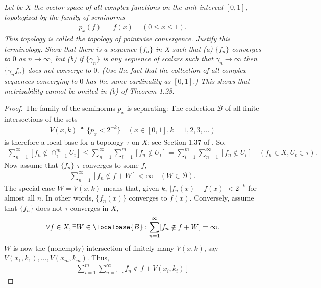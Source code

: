 \textit{
Let be $X$ the vector space of all complex functions on the unit interval %
$[0, 1]$, topologized by the family of seminorms %
%
\begin{align}
  p_x(f)= |f(x)\ \quad (0\leq x\leq 1).\nonumber
\end{align}
%
This topology is called the topology of pointwise convergence. %
Justify this terminology. %
%
Show that there is a sequence $\{f_n\}$ in X such that (a) %
%
  $\{f_n\}$ converges to $0$ as $n \to\infty$, %
%
but (b) if $\{\gamma_n\}$ is any sequence of scalars such that %
%
  $\gamma_n\to\infty$ %
%
then $\{\gamma_n f_n\}$ does not converge to $0$. %
(Use the fact that the collection of all complex sequences converging to $0$ %
has the same cardinality as $[0, 1]$.) %
%
This shows that metrizability cannot be omited in (b) of Theorem 1.28.
}
%
\begin{proof}
The family of the seminorms $p_x$ is separating: %
The collection $\mathscr{B}$ of all finite intersections of the sets %
%
\begin{align}
  V(x,k) \triangleq \{p_x < 2^{\minus k}\} 
  \quad (x \in [0, 1], k=1, 2, 3, \dots)
\end{align}
%
is therefore a local base for a topology $\tau$ on $X$; %
see Section 1.37 of \cite{FA}. %
So, 
%
\begin{align}
  \label{Inequality boolean series}
  \sum_{n=1}^\infty [f_n \notin \cap_{i=1}^m U_i] \leq 
  \sum_{n=1}^\infty \sum_{i=1}^m      [f_n \notin U_i] = 
  \sum_{i=1}^m      \sum_{n=1}^\infty [f_n \notin U_i]
  \quad (f_n \in X, U_i \in \tau).
\end{align}
%
Now assume that $\{f_n\}$ $\tau$-converges to some $f$, \ie 
%
\begin{align}
  \sum_{n=1}^\infty [f_n \notin f + W] < \infty \quad (W \in \mathscr{B}).
\end{align}
The special case %
%
$W = V(x, k)$ %
%
means that, given $k$, %
%
$|f_n(x) - f(x)| < 2^{\minus k}$ %
%
for almost all $n$. %
In other words, $\{f_n(x)\}$ converges to $f(x)$. %
%
Conversely, assume that $\{f_n\}$ does not $\tau$-converges in $X$, \ie %
%
\begin{align}
  \label{Divergence}
  \forall f \in X, \exists W \in \localbase{B}: 
    \sum_{n=1}^\infty [f_n \notin f +  W] = \infty. 
\end{align}
%
$W$ is now the (nonempty) intersection of finitely many $V(x, k)$, say %
%
  $V(x_1, k_1), \dots, V(x_m, k_m)$. %
%
Thus,  %
%
\begin{align}
  \sum_{i=1}^m \sum_{n=1}^\infty [f_n \notin f + V(x_i, k_i)]

\end{align}
\end{proof}
